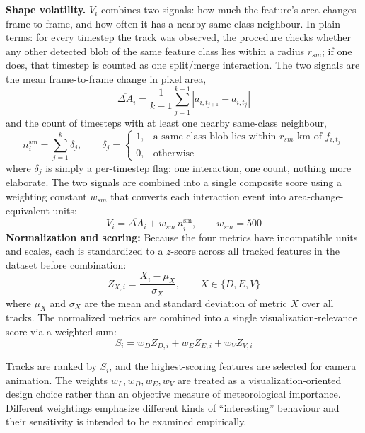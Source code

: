 \documentclass[journal abbreviation, manuscript]{copernicus}
\begin{document}
\textbf{Shape volatility.} $V_i$ combines two signals: how much the
feature's area changes frame-to-frame, and how often it has a nearby
same-class neighbour. In plain terms: for every timestep the track was
observed, the procedure checks whether any other detected blob of the same
feature class lies within a radius $r_{sm}$; if one does, that timestep is
counted as one split/merge interaction. The two signals are the mean
frame-to-frame change in pixel area,
\begin{equation}
\overline{\Delta A}_i =
\frac{1}{k-1}
\sum_{j=1}^{k-1}
\left| a_{i,t_{j+1}} - a_{i,t_j} \right|
\tag{8a}
\end{equation}
and the count of timesteps with at least one nearby same-class neighbour,
\begin{equation}
n_i^{\mathrm{sm}} = \sum_{j=1}^{k} \delta_j,
\qquad
\delta_j =
\begin{cases}
1, & \text{a same-class blob lies within } r_{sm}\text{ km of } f_{i,t_j} \\
0, & \text{otherwise}
\end{cases}
\tag{8b}
\end{equation}
where $\delta_j$ is simply a per-timestep flag: one interaction, one count,
nothing more elaborate. The two signals are combined into a single composite
score using a weighting constant $w_{sm}$ that converts each interaction
event into area-change-equivalent units:
\begin{equation}
V_i = \overline{\Delta A}_i + w_{sm}\, n_i^{\mathrm{sm}},
\qquad w_{sm} = 500
\tag{8}
\end{equation}
\textbf{Normalization and scoring:} Because the four metrics have incompatible units and scales, each is standardized to a $z$-score across all tracked features in the dataset before combination:
\begin{equation}
Z_{X,i} =
\frac{X_i-\mu_X}{\sigma_X},
\qquad
X \in \{D,E,V\}
\tag{8}
\end{equation}
where $\mu_X$ and $\sigma_X$ are the mean and standard deviation of metric $X$ over all tracks. The normalized metrics are combined into a single visualization-relevance score via a weighted sum:
\begin{equation}
S_i =
w_D Z_{D,i}
+
w_E Z_{E,i}
+
w_V Z_{V,i}
\tag{9}
\end{equation}

Tracks are ranked by $S_i$, and the highest-scoring features are selected for camera animation. The weights $w_L,w_D,w_E,w_V$ are treated as a visualization-oriented design choice rather than an objective measure of meteorological importance. Different weightings emphasize different kinds of ``interesting'' behaviour and their sensitivity is intended to be examined empirically.
\end{document}
